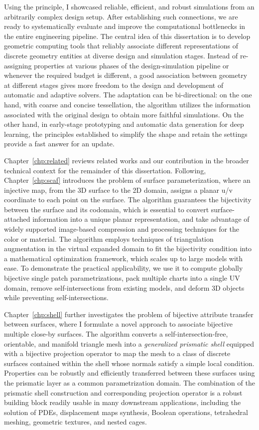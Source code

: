 Using the principle, I showcased reliable, efficient, and robust simulations from an arbitrarily complex design setup. After establishing such connections, we are ready to systematically evaluate and improve the computational bottlenecks in the entire engineering pipeline.
The central idea of this dissertation is to develop geometric computing tools that reliably associate different representations of discrete geometry entities at diverse design and simulation stages. 
Instead of re-assigning properties at various phases of the design-simulation pipeline or whenever the required budget is different, a good association between geometry at different stages gives more freedom to the design and development of automatic and adaptive solvers. The adaptation can be bi-directional: on the one hand, with coarse and concise tessellation, the algorithm utilizes the information associated with the original design to obtain more faithful simulations. On the other hand, in early-stage prototyping and automatic data generation for deep learning, the principles established to simplify the shape and retain the settings provide a fast answer for an update. 

Chapter~\ref*{chp:related} reviews related works and our contribution in the broader technical context for the remainder of this dissertation. 
Following, Chapter~\ref*{chp:scaf} introduces the problem of surface parameterization, where an injective map, from the 3D surface to the 2D domain, assigns a planar u/v coordinate to each point on the surface. The algorithm guarantees the bijectivity between the surface and its codomain, which is essential to convert surface-attached information into a unique planar representation, and take advantage of widely supported image-based compression and processing techniques for the color or material. 
The algorithm employs techniques of triangulation augmentation in the virtual expanded domain to fit the bijectivity condition into a mathematical optimization framework, which scales up to large models with ease. 
To demonstrate the practical applicability, we use it to compute globally bijective single patch parametrizations, pack multiple charts into a single UV domain, remove self-intersections from existing models, and deform 3D objects while preventing self-intersections.

Chapter~\ref*{chp:shell} further investigates the problem of bijective attribute transfer between surfaces, where I formulate a novel approach to associate bijective multiple close-by surfaces. The algorithm converts a self-intersection-free, orientable, and manifold triangle mesh into a \emph{generalized prismatic shell} equipped with a bijective projection operator to map the mesh to a class of discrete surfaces contained within the shell whose normals satisfy a simple local condition. 
Properties can be robustly and efficiently transferred between these surfaces using the prismatic layer as a common parametrization domain. 
The combination of the prismatic shell construction and corresponding projection operator is a robust building block readily usable in many downstream applications, including the solution of PDEs, displacement maps synthesis, Boolean operations, tetrahedral meshing, geometric textures, and nested cages.

